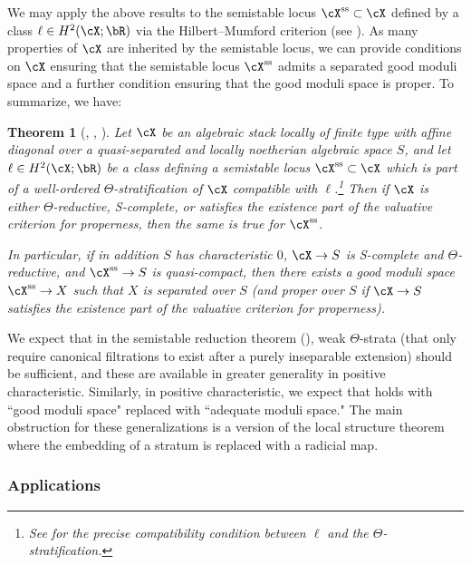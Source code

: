 \documentclass[a4paper]{amsart}
\numberwithin{equation}{section}
\theoremstyle{plain}
\newtheorem{thmx}{Theorem}
\theoremstyle{definition}
\renewcommand{\ss}{{\rm ss}}
\begin{document}
We may apply the above results to the semistable locus $\cX^{\ss} \subset \cX$ defined by a class $\ell \in H^2(\cX;\bR)$ via the Hilbert--Mumford criterion (see ).  As many properties of $\cX$ are inherited by the semistable locus, we can provide conditions on $\cX$ ensuring that the semistable locus $\cX^{\ss}$ admits a separated good moduli space and a further condition ensuring that the good moduli space is proper.  To summarize, we have:

\begin{thmx}[, , ] \label{T:C}
Let $\cX$ be an algebraic stack locally of finite type with affine diagonal over a quasi-separated and locally noetherian algebraic space $S$, and let $\ell \in H^2(\cX;\bR)$ be a class defining a semistable locus $\cX^{\ss} \subset \cX$ which is part of a well-ordered $\Theta$-stratification of $\cX$ compatible with $\ell$.\footnote{See  for the precise compatibility condition between $\ell$ and the $\Theta$-stratification.}
Then if $\cX$ is either $\Theta$-reductive,  {\textsf{S}}-complete, or satisfies the existence part of the valuative criterion for properness, then the same is true for $\cX^{\ss}$.

In particular, if in addition $S$ has characteristic $0$, $\cX \to S$ is {\textsf{S}}-complete and $\Theta$-reductive, and $\cX^{\ss} \to S$ is quasi-compact, then there exists a good moduli space $\cX^{\ss} \to X$ such that $X$ is separated over $S$ (and proper over $S$ if $\cX \to S$ satisfies the existence part of the valuative criterion for properness).
\end{thmx}


We expect that in the semistable reduction theorem (), weak $\Theta$-strata (that only require canonical filtrations to exist after a purely inseparable extension) should be sufficient, and these are available in greater generality in positive characteristic. Similarly, in positive characteristic, we expect that  holds with ``good moduli space" replaced with ``adequate moduli space."
The main obstruction for these generalizations is a version of the local structure theorem where the embedding of a stratum is replaced with a radicial map.

\subsubsection*{Applications}
\end{document}
